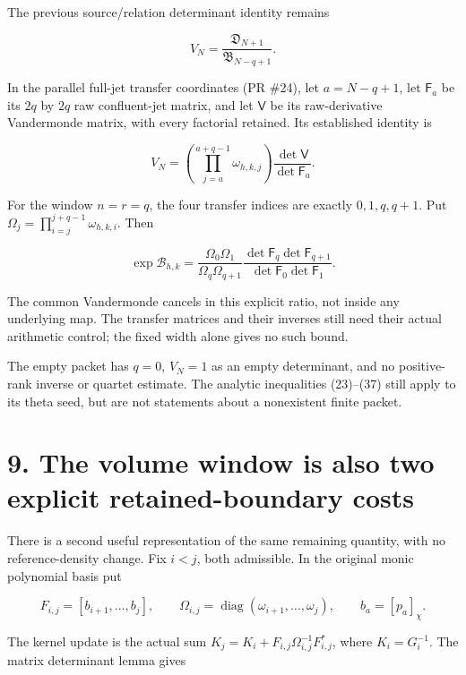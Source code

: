 The previous source/relation determinant identity remains

\[
 V_N=\frac{\mathfrak D_{N+1}}{\mathfrak B_{N-q+1}}.
                                                                         \tag{40}
\]

In the parallel full-jet transfer coordinates (PR \#24), let
\(a=N-q+1\), let \(\mathsf F_a\) be its \(2q\) by \(2q\) raw
confluent-jet matrix, and let \(\mathsf V\) be its raw-derivative
Vandermonde matrix, with every factorial retained. Its established
identity is

\[
 V_N=\left(\prod_{j=a}^{a+q-1}\omega_{h,k,j}\right)
                       \frac{\det\mathsf V}{\det\mathsf F_a}.           \tag{41}
\]

For the window \(n=r=q\), the four transfer indices are exactly
\(0,1,q,q+1\). Put \(\Omega_j=\prod_{i=j}^{j+q-1}\omega_{h,k,i}\). Then

\[
 \boxed{
 \exp\mathcal B_{h,k}
 =\frac{\Omega_0\Omega_1}{\Omega_q\Omega_{q+1}}
   \frac{\det\mathsf F_q\det\mathsf F_{q+1}}
        {\det\mathsf F_0\det\mathsf F_1}.
 }                                                                     \tag{42}
\]

The common Vandermonde cancels in this explicit ratio, not inside any
underlying map. The transfer matrices and their inverses still need
their actual arithmetic control; the fixed width alone gives no such
bound.

The empty packet has \(q=0\), \(V_N=1\) as an empty determinant, and no
positive-rank inverse or quartet estimate. The analytic inequalities
(23)--(37) still apply to its theta seed, but are not statements about a
nonexistent finite packet.

\section{9. The volume window is also two explicit retained-boundary
costs}\label{GraphV2:the-volume-window-is-also-two-explicit-retained-boundary-costs}

There is a second useful representation of the same remaining quantity,
with no reference-density change. Fix \(i<j\), both admissible. In the
original monic polynomial basis put

\[
 F_{i,j}=[b_{i+1},\ldots,b_j],\qquad
 \Omega_{i,j}=\operatorname{diag}(\omega_{i+1},\ldots,\omega_j),
 \qquad b_a=[p_a]_\chi.                                                 \tag{43}
\]

The kernel update is the actual sum
\(K_j=K_i+F_{i,j}\Omega_{i,j}^{-1}F_{i,j}^*\), where \(K_i=G_i^{-1}\).
The matrix determinant lemma gives

